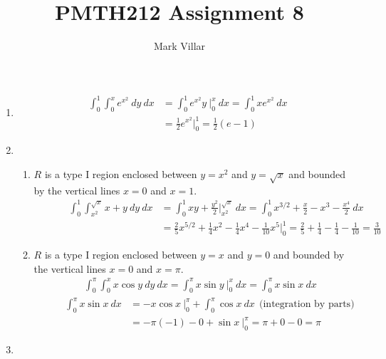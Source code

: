 \documentclass[12pt]{amsart}
\title{PMTH212 Assignment 8}
\author{Mark Villar}
\begin{document}
 

\maketitle 

\begin{enumerate}
	
	\item
		\begin{align*}
			\int^1_0 \int^x_0 e^{x^2} \ dy \ dx &= \int^1_0 e^{x^2}y \ \bigg|^x_0 \ dx =\int^1_0 xe^{x^2} \ dx \\
			&=\frac{1}{2}e^{x^2} \bigg|^1_0 = \frac{1}{2}(e-1)
		\end{align*}
		
	\medskip
		
	\item
		
		\begin{enumerate}
		
			\item $R$ is a type I region enclosed between $y=x^2$ and $y=\sqrt{x}$ and bounded by the vertical lines $x=0$ and $x=1$.
				\begin{align*}
					\ \ \ \ \ \ \ \ \ \ \ \ \ \ \int^1_0 \int^{\sqrt{x}}_{x^2} x+y \ dy \ dx &= \int^1_0 xy+\frac{y^2}{2} \bigg|^{\sqrt{x}}_{x^2} \ dx = \int^1_0 x^{3/2}+\frac{x}{2}-x^3-\frac{x^4}{2} \ dx \\
					&=\frac{2}{5}x^{5/2}+\frac{1}{4}x^2-\frac{1}{4}x^4-\frac{1}{10}x^5 \bigg|^1_0=\frac{2}{5}+\frac{1}{4}-\frac{1}{4}-\frac{1}{10}=\frac{3}{10}
				\end{align*}
			
			\item $R$ is a type I region enclosed between $y=x$ and $y=0$ and bounded by the vertical lines $x=0$ and $x=\pi$.
				\begin{align*}
					&\int^{\pi}_0 \int^x_0 x\cos y \ dy \ dx = \int^{\pi}_0 x\sin y \ \bigg|^x_0 \ dx= \int^{\pi}_0 x\sin x \ dx
				\end{align*}
				\begin{align*}
					\ \ \ \ \ \ \ \ \ \ \ \ \int^{\pi}_0 x\sin x \ dx&=-x\cos x \ \bigg|^{\pi}_0+\int^{\pi}_0 \cos x \ dx \ \ \text{(integration by parts)} \\
					&=-\pi(-1)-0+\sin x \ \bigg|^{\pi}_0 = \pi+0-0=\pi
				\end{align*}
				
		\end{enumerate}
					
	\item 
	

\end{enumerate}
\end{document}

